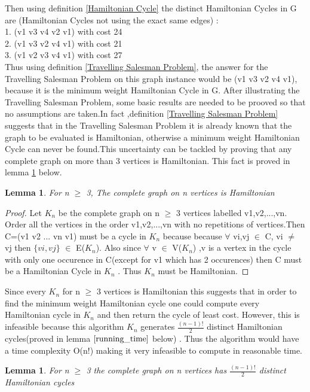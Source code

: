 \documentclass{article}
\newtheorem{lemma}[definition]{Lemma}
\begin{document}
Then using definition \ref{Hamiltonian Cycle} the distinct Hamiltonian Cycles in G are (Hamiltonian Cycles not using the exact same edges) :\\
1. (v1 v3 v4 v2 v1) with cost 24\\
2. (v1 v3 v2 v4 v1) with cost 21\\
3. (v1 v2 v3 v4 v1) with cost 27\\
Thus using definition \ref{Travelling Salesman Problem}, the answer for the Travelling Salesman Problem on this graph instance would be (v1 v3 v2 v4 v1), because it is the minimum weight Hamiltonian Cycle in G.
\newpage
After illustrating the Travelling Salesman Problem, some basic results are needed to be prooved so that no assumptions are taken.In fact ,definition \ref{Travelling Salesman Problem} suggests that in the Travelling Salesman Problem it is already known that the graph to be evaluated is Hamiltonian, otherwise a minimum weight Hamiltonian Cycle can never be found.This uncertainty can be tackled by proving that any complete graph on more than 3 vertices is Hamiltonian. This fact is proved in lemma \ref{Kn is Hamiltonian} below.
\begin{lemma}
\label{Kn is Hamiltonian}
For n $\geq$ 3, The complete graph on n vertices is Hamiltonian
\end{lemma}
\begin{proof}
Let $K_n$ be the complete graph on n $\geq$ 3 vertices labelled v1,v2,...,vn. Order all the vertices in the order v1,v2,...,vn with no repetitions of vertices.Then C=(v1 v2 ... vn v1) must be a cycle in $K_n$ because because $\forall$ vi,vj $\in$ C, vi $\ne$ vj then $\{vi,vj\}$ $\in$ E($K_n$). Also since $\forall$ v $\in$ V($K_n$) ,v is a vertex in the cycle with only one occurence in C(except for v1 which has 2 occurences) then C must be a Hamiltonian Cycle in $K_n$ . Thus $K_n$ must be Hamiltonian.
\end{proof}
Since every $K_n$ for n $\geq$ 3 vertices is Hamiltonian this suggests that in order to find the minimum weight Hamiltonian cycle one could compute every Hamiltonian cycle in $K_n$ and then return the cycle of least cost. However, this is infeasible because this algorithm $K_n$ generates $\frac{(n-1)!}{2}$ distinct Hamiltonian cycles(proved in  lemma $\ref{running_time}$ below) . Thus the algorithm would have a time complexity O(n!) making it very infeasible to compute in reasonable time.\cite{geeksforgeeks_2018}
\begin{lemma}
\label{running_time}
For n $\geq$ 3 the complete graph on n vertices has $\frac{(n-1)!}{2}$ distinct Hamiltonian cycles
\end{lemma}
\end{document}
